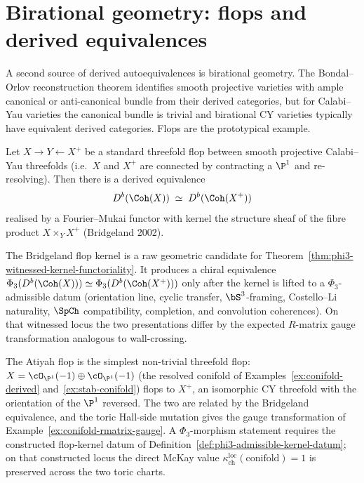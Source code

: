 \section{Birational geometry: flops and derived equivalences}
\label{sec:flops-derived}

A second source of derived autoequivalences is birational geometry. The Bondal--Orlov reconstruction theorem identifies smooth projective varieties with ample canonical or anti-canonical bundle from their derived categories, but for Calabi--Yau varieties the canonical bundle is trivial and birational CY varieties typically have equivalent derived categories. Flops are the prototypical example.

\begin{theorem}
\label{thm:bridgeland-flop}
Let $X \to Y \leftarrow X^+$ be a standard threefold flop between smooth projective Calabi--Yau threefolds (i.e.\ $X$ and $X^+$ are connected by contracting a $\P^1$ and re-resolving). Then there is a derived equivalence
\[
 D^b(\Coh(X)) \;\simeq\; D^b(\Coh(X^+))
\]
realised by a Fourier--Mukai functor with kernel the structure sheaf of the fibre product $X \times_Y X^+$ (Bridgeland 2002).
\end{theorem}

The Bridgeland flop kernel is a raw geometric candidate for
Theorem~\ref{thm:phi3-witnessed-kernel-functoriality}. It produces a
chiral equivalence
$\Phi_3(D^b(\Coh(X))) \simeq \Phi_3(D^b(\Coh(X^+)))$
only after the kernel is lifted to a $\Phi_3$-admissible datum
\textup{(}orientation line, cyclic transfer, $\bS^3$-framing,
Costello--Li naturality, $\SpCh$ compatibility, completion, and
convolution coherences\textup{)}. On that witnessed locus the two
presentations differ by the expected $R$-matrix gauge transformation
analogous to wall-crossing.

\begin{example}
\label{ex:atiyah-flop}
The Atiyah flop is the simplest non-trivial threefold flop: $X = \cO_{\P^1}(-1) \oplus \cO_{\P^1}(-1)$ (the resolved conifold of Examples~\ref{ex:conifold-derived} and~\ref{ex:stab-conifold}) flops to $X^+$, an isomorphic CY threefold with the orientation of the $\P^1$ reversed. The two are related by the Bridgeland equivalence, and the toric Hall-side mutation gives the gauge transformation of Example~\ref{ex:conifold-rmatrix-gauge}. A $\Phi_3$-morphism statement requires the constructed flop-kernel datum of Definition~\ref{def:phi3-admissible-kernel-datum}; on that constructed locus the direct McKay value $\kappa_{\mathrm{ch}}^{\mathrm{loc}}(\mathrm{conifold}) = 1$ is preserved across the two toric charts.
\end{example}

